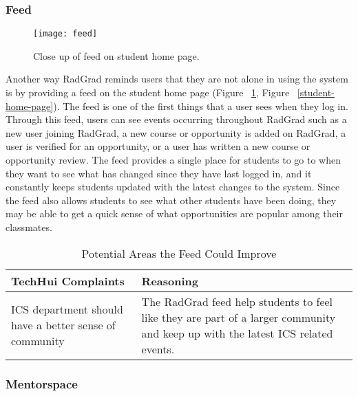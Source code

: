 \subsubsection{Feed}

\begin{figure}[htbp!]
\centering
\texttt{[image: feed]}
\caption{Close up of feed on student home page.}
\label{feed}
\end{figure}
Another way RadGrad reminds users that they are not alone in using the system is by providing a feed on the student home page (Figure ~\ref{feed}, Figure ~\ref{student-home-page}). The feed is one of the first things that a user sees when they log in. Through this feed, users can see events occurring throughout RadGrad such as a new user joining RadGrad, a new course or opportunity is added on RadGrad, a user is verified for an opportunity, or a user has written a new course or opportunity review. The feed provides a single place for students to go to when they want to see what has changed since they have last logged in, and it constantly keeps students updated with the latest changes to the system. Since the feed also allows students to see what other students have been doing, they may be able to get a quick sense of what opportunities are popular among their classmates.

\begin{table}[htbp!]
\centering
 \caption{Potential Areas the Feed Could Improve}
\begin{tabular}{  |p{4cm}|p{12cm}| } 
\hline
 \textbf{TechHui Complaints} & \textbf{Reasoning} \\ 
  \hline
ICS department should have a better sense of community & The RadGrad feed help students to feel like they are part of a larger community and keep up with the latest ICS related events. \\
\hline
\end{tabular}
\end{table}

\subsubsection{Mentorspace}

